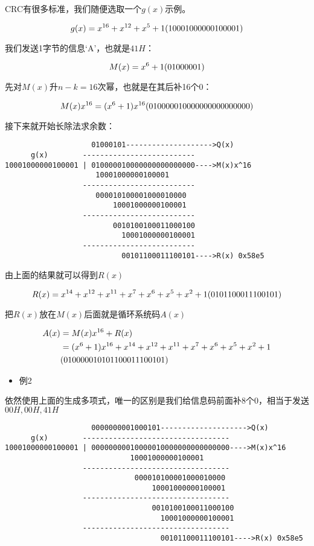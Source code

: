 \documentclass[
]{article}
\begin{document}
CRC有很多标准，我们随便选取一个$g(x)$示例。

$$g(x)=x^{16}+x^{12}+x^5+1\\
(10001000000100001)$$

我们发送1字节的信息`A'，也就是$41H$：

$$M(x)=x^6+1\\
(01000001)$$

先对$M(x)$升$n-k=16$次幂，也就是在其后补16个0：

$$M(x)x^{16}=(x^6+1)x^{16}\\
(010000010000000000000000)$$

接下来就开始长除法求余数：

\begin{verbatim}
                    01000101-------------------->Q(x)
      g(x)        --------------------------
10001000000100001 | 010000010000000000000000---->M(x)x^16
                     10001000000100001
                  --------------------------
                     000010100001000010000
                         10001000000100001
                  --------------------------
                         0010100100011000100
                           10001000000100001
                  --------------------------
                           00101100011100101---->R(x) 0x58e5
\end{verbatim}

由上面的结果就可以得到$R(x)$

$$R(x)=x^{14}+x^{12}+x^{11}+x^{7}+x^{6}+x^{5}+x^{2}+1\\
(0101100011100101)$$

把$R(x)$放在$M(x)$后面就是循环系统码$A(x)$

\begin{align}
A(x)&=M(x)x^{16}+R(x)\\
&=(x^6+1)x^{16}+x^{14}+x^{12}+x^{11}+x^{7}+x^{6}+x^{5}+x^{2}+1\\
&(01000001 \space 0101100011100101)
\end{align}

\begin{itemize}
\item
  例2
\end{itemize}

依然使用上面的生成多项式，唯一的区别是我们给信息码前面补8个0，相当于发送$00H,00H,41H$

\begin{verbatim}
                    0000000001000101-------------------->Q(x)
      g(x)        ----------------------------------
10001000000100001 | 00000000010000010000000000000000---->M(x)x^16
                             10001000000100001
                  ----------------------------------
                              000010100001000010000
                                  10001000000100001
                  ----------------------------------
                                  0010100100011000100
                                    10001000000100001
                  ----------------------------------
                                    00101100011100101---->R(x) 0x58e5
\end{verbatim}
\end{document}
